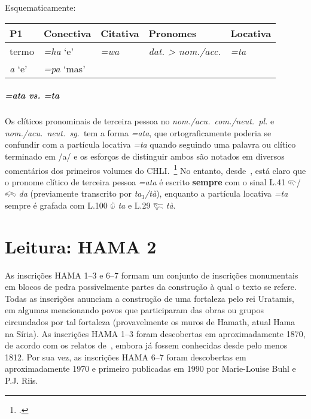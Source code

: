 Esquematicamente:

\begin{center}
	\begin{tabular}[c]{lllll}
		\toprule
		P1\emph{}    & Conectiva\emph{} & Citativa\emph{} & Pronomes\emph{}         & Locativa\emph{} \\
		\midrule
		\emph{}termo & \emph{=ha} `e'   & \emph{=wa}      & \emph{dat. > nom./acc.} & \emph{=ta}      \\
		\emph{a} `e' & \emph{=pa} `mas' & \emph{}         & \emph{}                 & \emph{}         \\
		\bottomrule
	\end{tabular}
\end{center}

\paragraph{\emph{=ata vs. =ta}}
Os clíticos pronominais de terceira pessoa no \emph{nom.\slash{}acu.\
	com.\slash{}neut.\ pl.} e \emph{nom.\slash{}acu.\ neut.\ sg.}\ tem a forma
\emph{=ata}, que ortograficamente poderia se confundir com a partícula locativa
\emph{=ta} quando seguindo uma palavra ou clítico terminado em /a/ e
os esforços de distinguir ambos são notados em diversos comentários dos
primeiros volumes do CHLI.~\footnote{\citet{CHLI11,CHLI12,CHLI13,CHLI2}.}
No entanto, desde~\citet{Rieken2008}, está claro que o pronome clítico de
terceira pessoa \emph{=ata} é escrito \textbf{sempre} com o sinal L.41
𔐬\slash{}𔐫 \emph{da} (previamente transcrito por \emph{ta$_3$\slash{}tà}),
enquanto a partícula locativa \emph{=ta} sempre é grafada com L.100 𔑰 \emph{ta} e
L.29 𔐞 \emph{tà}.


\chapter{Leitura: HAMA 2}

As inscrições HAMA 1--3 e 6--7 formam um conjunto de inscrições monumentais
em blocos de pedra possivelmente partes da construção à qual o texto se refere.
Todas as inscrições anunciam a construção de uma fortaleza pelo rei Uratamis, em
algumas mencionando povos que participaram das obras ou grupos circundados por
tal fortaleza (provavelmente os muros de Hamath, atual Hama na Síria).
As inscrições HAMA 1--3 foram descobertas em aproximadamente 1870, de acordo com
os relatos de~\citet[pp. 333ff.]{UnexploredSyriaI}, embora já fossem conhecidas
desde pelo menos 1812.
Por sua vez, as inscrições HAMA 6--7 foram descobertas em aproximadamente 1970 e
primeiro publicadas em 1990 por Marie-Louise Buhl e P.J. Riis.

